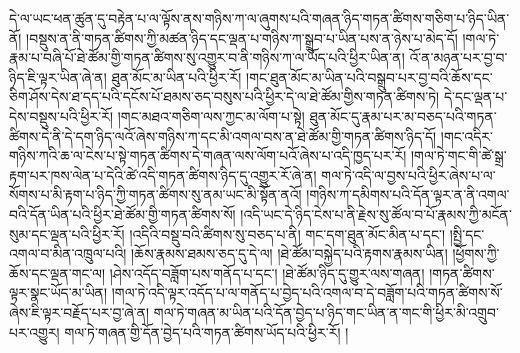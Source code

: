 དེ་ལ་ཡང་ཕན་ཚུན་དུ་བརྟེན་པ་ལ་ལྟོས་ནས་གཉིས་ཀ་ལ་ཞུགས་པའི་གཞན་ཉིད་གཏན་ཚིགས་གཅིག་པ་ཉིད་ཡིན་ནོ། །བསྡུས་ན་ནི་གཏན་ཚིགས་ཀྱི་མཚན་ཉིད་དང་ལྡན་པ་གཉིས་ཀ་སྒྲུབ་པ་ཡིན་པས་ན་ཉེས་པ་མེད་དོ། །གལ་ཏེ་རྣམ་པ་བཞི་པོ་ཐེ་ཚོམ་གྱི་གཏན་ཚིགས་སུ་འགྱུར་བ་ནི་གཉིས་ཀ་ལ་ཡོད་པའི་ཕྱིར་ཡིན་ན། འོ་ན་མཉན་པར་བྱ་བ་ཉིད་ཇི་ལྟར་ཡིན་ཞེ་ན། ཐུན་མོང་མ་ཡིན་པའི་ཕྱིར་རོ། །གང་ཐུན་མོང་མ་ཡིན་པའི་བསྒྲུབ་པར་བྱ་བའི་ཆོས་དང་ཅིག་ཤོས་དེས་ཐ་དད་པའི་དངོས་པོ་ཐམས་ཅད་བསུས་པའི་ཕྱིར་དེ་ལ་ཐེ་ཚོམ་གྱིས་གཏན་ཚིགས་ཏེ། དེ་དང་ལྡན་པ་དེས་བསྡུས་པའི་ཕྱིར་རོ། །གང་མཐའ་གཅིག་ལས་ཀྱང་མ་ལོག་པ་སྟེ། ཐུན་མོང་དུ་རྣམ་པར་མ་བཅད་པའི་གཏན་ཚིགས་དེ་ནི་དེ་དག་ཉིད་ལའོ་ཞེས་གཉིས་ཀ་དང་མི་འགལ་བས་ན་ཐེ་ཚོམ་གྱི་གཏན་ཚིགས་ཉིད་དོ། །གང་འདིར་གཉིས་ཀའི་ཆ་ལ་ངེས་པ་སྟེ་གཏན་ཚིགས་དེ་གཞན་ལས་ལོག་པའོ་ཞེས་པ་འདི་ཁྱད་པར་རོ། །གལ་ཏེ་གང་གི་ཚེ་སྒྲ་རྟག་པར་ཁས་ལེན་པ་དེའི་ཚེ་འདི་གཏན་ཚིགས་ཉིད་དུ་འགྱུར་རོ་ཞེ་ན། གལ་ཏེ་འདི་ལ་བྱས་པའི་ཕྱིར་ཞེས་པ་ལ་སོགས་པ་མི་རྟག་པ་ཉིད་ཀྱི་གཏན་ཚིགས་སུ་ནམ་ཡང་མི་སྟོན་ནའོ། །གཉིས་ཀ་དམིགས་པའི་དོན་ལྟར་ན་ནི་འགལ་བའི་དོན་ཡིན་པའི་ཕྱིར་ཐེ་ཚོམ་གྱི་གཏན་ཚིགས་སོ། །འདི་ཡང་དེ་ཉིད་ངེས་པ་ནི་རྗེས་སུ་ཚོལ་བ་པོ་རྣམས་ཀྱི་མངོན་སུམ་དང་ལྡན་པའི་ཕྱིར་རོ། །འདིའི་བསྡུ་བའི་ཚིགས་སུ་བཅད་པ་ནི། གང་དག་ཐུན་མོང་མིན་པ་དང་། །སྤྱི་དང་འགལ་བ་མིན་འཁྲུལ་པའི། །ཆོས་རྣམས་ཐམས་ཅད་དུ་དེ་ལ། །ཐེ་ཚོམ་བསྐྱེད་པའི་རྟགས་རྣམས་ཡིན། །ཕྱོགས་ཀྱི་ཆོས་དང་ལྡན་གང་ལ། །ཤེས་འདོད་བཟློག་པས་གནོད་པ་དང་། །ཐེ་ཚོམ་ཉིད་དུ་གྱུར་ལས་གཞན། །གཏན་ཚིགས་ལྟར་སྣང་ཡོད་མ་ཡིན། །གལ་ཏེ་འདི་ལྟར་འདོད་པ་ལ་གནོད་པ་བྱེད་པའི་འགལ་བ་དེ་བཟློག་པའི་གཏན་ཚིགས་སོ་ཞེས་ཇི་ལྟར་བརྗོད་པར་བྱ་ཞེ་ན། གལ་ཏེ་གཞན་མ་ཡིན་པའི་དོན་བྱེད་པ་ཉིད་གང་ཡིན་ན་གང་གི་ཕྱིར་མི་འགྲུབ་པར་འགྱུར། གལ་ཏེ་གཞན་གྱི་དོན་བྱེད་པའི་གཏན་ཚིགས་ཡོད་པའི་ཕྱིར་རོ། །
